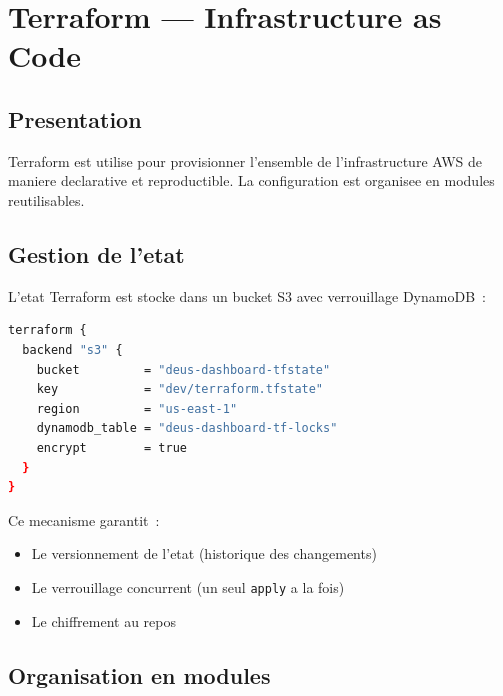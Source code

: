 \chapter{Terraform --- Infrastructure as Code}

\section{Presentation}

Terraform est utilise pour provisionner l'ensemble de l'infrastructure AWS de maniere
declarative et reproductible. La configuration est organisee en modules reutilisables.

\section{Gestion de l'etat}

L'etat Terraform est stocke dans un bucket S3 avec verrouillage DynamoDB~:

\begin{lstlisting}[language=bash,caption={Configuration du backend S3}]
terraform {
  backend "s3" {
    bucket         = "deus-dashboard-tfstate"
    key            = "dev/terraform.tfstate"
    region         = "us-east-1"
    dynamodb_table = "deus-dashboard-tf-locks"
    encrypt        = true
  }
}
\end{lstlisting}

Ce mecanisme garantit~:
\begin{itemize}
    \item Le versionnement de l'etat (historique des changements)
    \item Le verrouillage concurrent (un seul \texttt{apply} a la fois)
    \item Le chiffrement au repos
\end{itemize}

\section{Organisation en modules}

